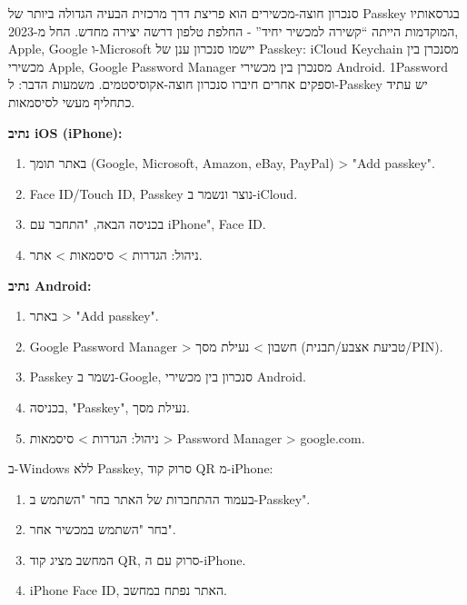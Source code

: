 \begin{tcbinfo}{סנכרון חוצה-מכשירים הוא פריצת דרך מרכזית}
הבעיה הגדולה ביותר של Passkey בגרסאותיו המוקדמות הייתה “קשירה למכשיר יחיד” - החלפת טלפון דרשה יצירה מחדש. החל מ-2023, Apple, Google ו-Microsoft יישמו סנכרון ענן של Passkey: iCloud Keychain מסנכרן בין מכשירי Apple, Google Password Manager מסנכרן בין מכשירי Android. 1Password וספקים אחרים חיברו סנכרון חוצה-אקוסיסטמים. משמעות הדבר: ל-Passkey יש עתיד כתחליף מעשי לסיסמאות.

\end{tcbinfo}


\textbf{נתיב iOS (iPhone):}

\begin{enumerate}
  \item באתר תומך (Google, Microsoft, Amazon, eBay, PayPal) > "Add passkey".
  \item Face ID/Touch ID, Passkey נוצר ונשמר ב-iCloud.
  \item בכניסה הבאה, "התחבר עם iPhone", Face ID.
  \item ניהול: הגדרות > סיסמאות > אתר.
\end{enumerate}

\textbf{נתיב Android:}

\begin{enumerate}
  \item באתר > "Add passkey".
  \item Google Password Manager > חשבון > נעילת מסך (טביעת אצבע/תבנית/PIN).
  \item Passkey נשמר ב-Google, סנכרון בין מכשירי Android.
  \item בכניסה, "Passkey", נעילת מסך.
  \item ניהול: הגדרות > סיסמאות > Password Manager > google.com.
\end{enumerate}


ב-Windows ללא Passkey, סרוק קוד QR מ-iPhone:

\begin{enumerate}
  \item בעמוד ההתחברות של האתר בחר "השתמש ב-Passkey".
  \item בחר "השתמש במכשיר אחר".
  \item המחשב מציג קוד QR, סרוק עם ה-iPhone.
  \item iPhone Face ID, האתר נפתח במחשב.
\end{enumerate}

